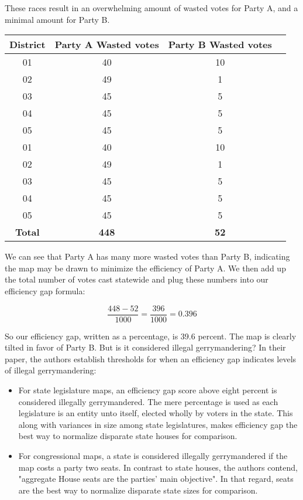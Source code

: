 \documentclass[sigconf]{acmart}
\begin{document}
These races result in an overwhelming amount of wasted votes for Party A, and a minimal amount for Party B.

\begin{center}
\begin{tabular}{ |c|c|c|c| } 
 \hline
 District & Party A Wasted votes & Party B Wasted votes \\
 \hline
 01 & 40 & 10 \\
 \hline
 02 & 49 & 1 \\
 \hline
 03 & 45 & 5 \\
 \hline
 04 & 45 & 5 \\
 \hline
 05 & 45 & 5 \\
 \hline
 01 & 40 & 10 \\
 \hline
 02 & 49 & 1 \\
 \hline
 03 & 45 & 5 \\
 \hline
 04 & 45 & 5 \\
 \hline
 05 & 45 & 5 \\
 \hline
 \textbf{Total} & \textbf{448} & \textbf{52} \\
 \hline
\end{tabular}
\end{center}

We can see that Party A has many more wasted votes than Party B, indicating the map may be drawn to minimize the efficiency of Party A. We then add up the total number of votes cast statewide and plug these numbers into our efficiency gap formula:

\[\frac{448-52}{1000} = \frac{396}{1000} = 0.396\]

So our efficiency gap, written as a percentage, is 39.6 percent. The map is clearly tilted in favor of Party B. But is it considered illegal gerrymandering? In their paper, the authors establish thresholds for when an efficiency gap indicates levels of illegal gerrymandering:

\begin{itemize}
    \item For state legislature maps, an efficiency gap score above eight percent is considered illegally gerrymandered. The mere percentage is used as each legislature is an entity unto itself, elected wholly by voters in the state. This along with variances in size among state legislatures, makes efficiency gap the best way to normalize disparate state houses for comparison.
    \item For congressional maps, a state is considered illegally gerrymandered if the map costs a party two seats. In contrast to state houses, the authors contend, "aggregate House seats are the parties' main objective". In that regard, seats are the best way to normalize disparate state sizes for comparison.\cite{chicagothreshold}
\end{itemize}
\end{document}
